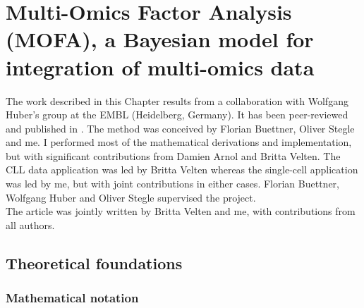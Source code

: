 \graphicspath{{Chapter2/Figs/}}

\chapter{Multi-Omics Factor Analysis (MOFA), a Bayesian model for integration of multi-omics data}

The work described in this Chapter results from a collaboration with Wolfgang Huber's group at the EMBL (Heidelberg, Germany). It has been peer-reviewed and published in \cite{Argelaguet2018}. The method was conceived by Florian Buettner, Oliver Stegle and me. I performed most of the mathematical derivations and implementation, but with significant contributions from Damien Arnol and Britta Velten. The CLL data application was led by Britta Velten whereas the single-cell application was led by me, but with joint contributions in either cases. Florian Buettner, Wolfgang Huber and Oliver Stegle supervised the project.\\
The article was jointly written by Britta Velten and me, with contributions from all authors.

\section{Theoretical foundations}

\subsection{Mathematical notation} \label{section:mathematical_notation}

